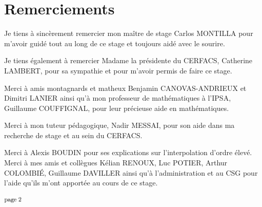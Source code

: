 \chapter*{Remerciements}

Je tiens à sincèrement remercier mon maître de stage Carlos MONTILLA pour m'avoir guidé tout au long de ce stage et toujours aidé avec le sourire.

\vspace{0.5cm}

Je tiens également à remercier Madame la présidente du CERFACS, Catherine LAMBERT, pour sa sympathie et pour m'avoir permis de faire ce stage. %

Merci à amis montagnards et matheux Benjamin CANOVAS-ANDRIEUX et Dimitri \mbox{LANIER} ainsi qu'à mon professeur de mathématiques à l'IPSA, Guillaume COUFFIGNAL, pour leur précieuse aide en mathématiques.

Merci à mon tuteur pédagogique, Nadir MESSAI, pour son aide dans ma recherche de stage et au sein du CERFACS.

Merci à Alexis BOUDIN pour ses explications sur l'interpolation d'ordre élevé.
Merci à mes amis et collègues Kélian RENOUX, Luc POTIER, Arthur COLOMBIÉ, Guillaume DAVILLER ainsi qu'à l'administration et au CSG pour l'aide qu'ils m'ont apportée au cours de ce stage.




\vspace*{\fill} %
\begin{center}
    \includegraphics[width=0.067\textwidth]{images/page_2.png}
\end{center}
\vspace*{-13.5cm} %
\vspace*{\fill} %
